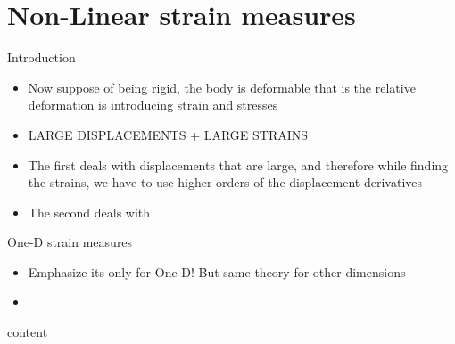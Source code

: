 \section{Non-Linear strain measures}
	\begin{frame}{Introduction}
		\begin{itemize}
			\item Now suppose of being rigid, the body is deformable that is the relative deformation is introducing strain and stresses
			\item LARGE DISPLACEMENTS + LARGE STRAINS
			\item The first deals with displacements that are large, and therefore while finding the strains, we have to use higher orders of the displacement derivatives
			\item The second deals with 			
		\end{itemize}
	\end{frame}

	\begin{frame}{One-D strain measures}
		\begin{itemize}
			\item Emphasize its only for One D! But same theory for other dimensions
			\item 
			
		\end{itemize}
		content
	\end{frame}